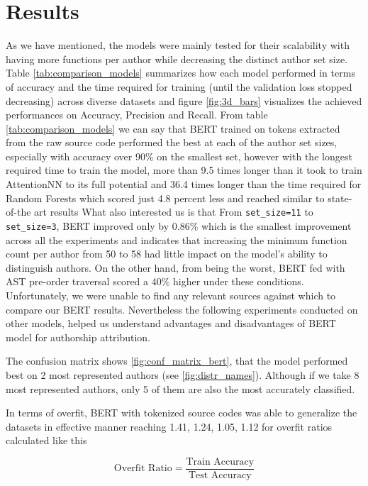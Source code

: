\documentclass[conference]{IEEEtran}
\begin{document}
    
\section{Results}

As we have mentioned, the models were mainly tested for their scalability with having more functions per author while decreasing the distinct author set size.
Table \ref{tab:comparison_models} summarizes how each model performed in terms of accuracy and the time required for training (until the validation loss stopped decreasing) across diverse datasets
and figure \ref{fig:3d_bars} visualizes the achieved performances on Accuracy, Precision and Recall. From table \ref{tab:comparison_models} we can say that BERT 
trained on tokens extracted from the raw source code performed the best at each of the author set sizes, especially with accuracy over 90\% on the smallest set, however with the longest required time to train the model, more than 
9.5 times longer than it took to train AttentionNN to its full potential and 36.4 times longer than the time required for Random Forests which scored just 4.8 percent less and reached similar to state-of-the art results \cite{rf1} \cite{rf2}
What also interested us is that From \texttt{set\_size=11} to \texttt{set\_size=3}, BERT improved only by 0.86\% which is the smallest improvement across all the experiments and indicates that increasing the minimum function 
count per author from 50 to 58 had little impact on the model's ability to distinguish authors. 
On the other hand, from being the worst, BERT fed with AST pre-order traversal scored a 40\% higher under these conditions. Unfortunately, we were unable to find any relevant sources against which to compare our BERT results.
Nevertheless the following experiments conducted on other models, helped us understand advantages and disadvantages of BERT model for authorship attribution.

The confusion matrix shows \ref{fig:conf_matrix_bert}, that the model performed best on 2 most represented authors
(see \ref{fig:distr_names}). Although if we take 8 most represented authors, only 5 of them are also 
the most accurately classified.

In terms of overfit, BERT with tokenized source codes was able to generalize the datasets in effective manner reaching 1.41, 1.24, 1.05, 1.12 for overfit ratios 
calculated like this

\begin{equation}
    \text{Overfit Ratio} = \frac{\text{Train Accuracy}}{\text{Test Accuracy}}
\end{equation}
\end{document}
